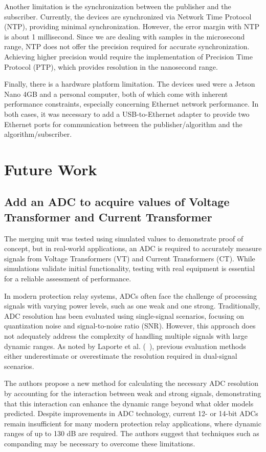 Another limitation is the synchronization between the publisher and the subscriber. Currently, the devices are synchronized via Network Time Protocol (NTP), providing minimal synchronization. However, the error margin with NTP is about 1 millisecond. Since we are dealing with samples in the microsecond range, NTP does not offer the precision required for accurate synchronization. Achieving higher precision would require the implementation of Precision Time Protocol (PTP), which provides resolution in the nanosecond range.

Finally, there is a hardware platform limitation. The devices used were a Jetson Nano 4GB and a personal computer, both of which come with inherent performance constraints, especially concerning Ethernet network performance. In both cases, it was necessary to add a USB-to-Ethernet adapter to provide two Ethernet ports for communication between the publisher/algorithm and the algorithm/subscriber.

\section{Future Work}

\subsection{Add an ADC to acquire values of Voltage Transformer and Current Transformer}

The merging unit was tested using simulated values to demonstrate proof of concept, but in real-world applications, an ADC is required to accurately measure signals from Voltage Transformers (VT) and Current Transformers (CT). While simulations validate initial functionality, testing with real equipment is essential for a reliable assessment of performance.

In modern protection relay systems, ADCs often face the challenge of processing signals with varying power levels, such as one weak and one strong. Traditionally, ADC resolution has been evaluated using single-signal scenarios, focusing on quantization noise and signal-to-noise ratio (SNR). However, this approach does not adequately address the complexity of handling multiple signals with large dynamic ranges. As noted by Laporte et al. (~\cite{laporte2024adc}), previous evaluation methods either underestimate or overestimate the resolution required in dual-signal scenarios.

The authors propose a new method for calculating the necessary ADC resolution by accounting for the interaction between weak and strong signals, demonstrating that this interaction can enhance the dynamic range beyond what older models predicted. Despite improvements in ADC technology, current 12- or 14-bit ADCs remain insufficient for many modern protection relay applications, where dynamic ranges of up to 130 dB are required. The authors suggest that techniques such as companding may be necessary to overcome these limitations.

